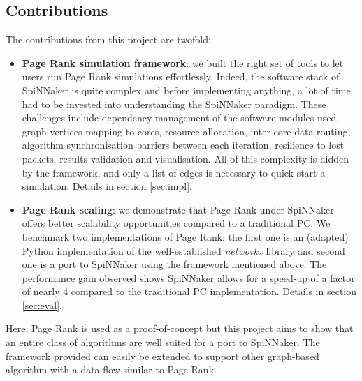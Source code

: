 \subsection{Contributions}

The contributions from this project are twofold:

\begin{itemize}
\item \textbf{Page Rank simulation framework}: we built the right set of tools to let users run Page Rank simulations effortlessly. Indeed, the software stack of SpiNNaker is quite complex and before implementing anything, a lot of time had to be invested into understanding the SpiNNaker paradigm. These challenges include dependency management of the software modules used, graph vertices mapping to cores, resource allocation, inter-core data routing, algorithm synchronisation barriers between each iteration, resilience to lost packets, results validation and visualisation. All of this complexity is hidden by the framework, and only a list of edges is necessary to quick start a simulation. Details in section \ref{sec:impl}.

\item \textbf{Page Rank scaling}: we demonstrate that Page Rank under SpiNNaker offers better scalability opportunities compared to a traditional PC. We benchmark two implementations of Page Rank: the first one is an (adapted) Python implementation of the well-established \textit{networkx} \cite{networkx} library and second one is a port to SpiNNaker using the framework mentioned above. The performance gain observed shows SpiNNaker allows for a speed-up of a factor of nearly 4 compared to the traditional PC implementation. Details in section \ref{sec:eval}.
\end{itemize}


Here, Page Rank is used as a proof-of-concept but this project aims to show that an entire class of algorithms are well suited for a port to SpiNNaker. The framework provided can easily be extended to support other graph-based algorithm with a data flow similar to Page Rank.

